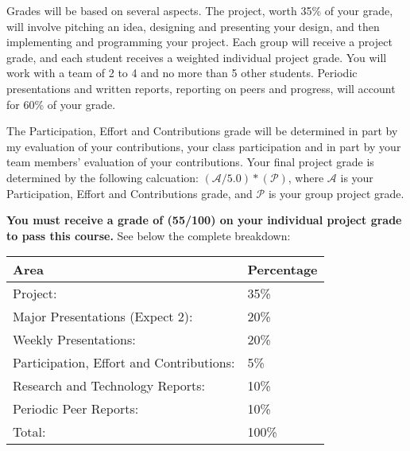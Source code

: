 Grades will be based on several aspects.
The project, worth 35\% of your grade, will involve pitching an idea, designing and presenting your design, and then implementing and programming your project. Each group will receive a project grade, and each student receives a weighted individual project grade.
You will work with a team of 2 to 4 and no more than 5 other students.
Periodic presentations and written reports, reporting on peers and progress, will account for 60\% of your grade.

The Participation, Effort and Contributions grade will be determined in part by my evaluation of your contributions, your class participation and in part by your team members' evaluation of your contributions.
Your final project grade is determined by the following calcuation: $(\mathcal{A}/5.0)*(\mathcal{P})$, where $\mathcal{A}$ is your Participation, Effort and Contributions grade, and $\mathcal{P}$ is your group project grade.

\textbf{You must receive a grade of (55/100) on your individual project grade to pass this course.} See below the complete breakdown:

\par\vspace{1cm}
\begin{tabular}{ @{}ll@{} }
    \toprule
        Area & Percentage \\
    \midrule
        Project: & 35\% \\
        Major Presentations (Expect 2): & 20\% \\
        Weekly Presentations: & 20\% \\
        Participation, Effort and Contributions: & 5\% \\
        Research and Technology Reports: & 10\% \\
        Periodic Peer Reports: & 10\% \\
        Total: & 100\% \\
    \bottomrule
\end{tabular}